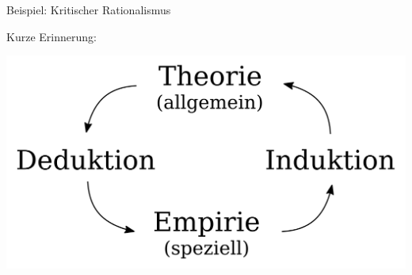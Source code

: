 \documentclass{beamer}
\begin{document}
\begin{frame}{Beispiel: Kritischer Rationalismus}

Kurze Erinnerung:

\centering

\includegraphics[width=\textwidth]{Induktion-Deduktion.svg.png}



\end{frame}
\end{document}
